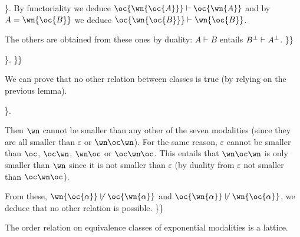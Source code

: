 \}. By functoriality we deduce \(\oc{\wn{\oc{A}}}\vdash \oc{\wn{A}}\)
and by \(A=\wn{\oc{B}}\) we deduce
\(\oc{\wn{\oc{B}}}\vdash \wn{\oc{B}}\).

The others are obtained from these ones by duality: \(A\vdash B\)
entails \(B^\bot\vdash A^\bot\). \}\}

\}. \}\}

We can prove that no other relation between classes is true (by relying
on the previous lemma).

\}.

Then \(\wn\) cannot be smaller than any other of the seven modalities
(since they are all smaller than \(\varepsilon\) or \(\wn\oc\wn\)). For
the same reason, \(\varepsilon\) cannot be smaller than \(\oc\),
\(\oc\wn\), \(\wn\oc\) or \(\oc\wn\oc\). This entails that \(\wn\oc\wn\)
is only smaller than \(\wn\) since it is not smaller than
\(\varepsilon\) (by duality from \(\varepsilon\) not smaller than
\(\oc\wn\oc\)).

From these, \(\wn{\oc{\alpha}}\not\vdash\oc{\wn{\alpha}}\) and
\(\oc{\wn{\alpha}}\not\vdash\wn{\oc{\alpha}}\), we deduce that no other
relation is possible. \}\}

The order relation on equivalence classes of exponential modalities is a
lattice.


